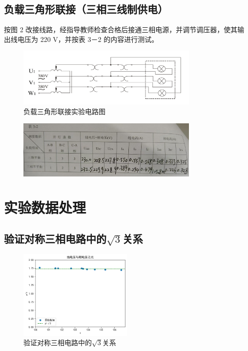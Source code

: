 \documentclass{article}
\begin{document}
\subsection{ 负载三角形联接（三相三线制供电）}
按图 2 改接线路，经指导教师检查合格后接通三相电源，并调节调压器，使其输出线电压为 220 V，并按表 3－2 的内容进行测试。

\begin{figure}[H]
    \centering
    \includegraphics[width=0.8\textwidth]{img2.png}
    \caption{负载三角形联接实验电路图}
\end{figure}

\begin{figure}[H]
    \centering
    \includegraphics[width=0.8\textwidth]{table2.jpg}
\end{figure}

\section{实验数据处理 }
\subsection{ 验证对称三相电路中的$ \sqrt{3} $关系}
\begin{figure}[H]
    \centering
    \includegraphics[width=0.5\textwidth]{output1.png}
    \caption{验证对称三相电路中的$ \sqrt{3} $关系}
\end{figure}
\end{document}
